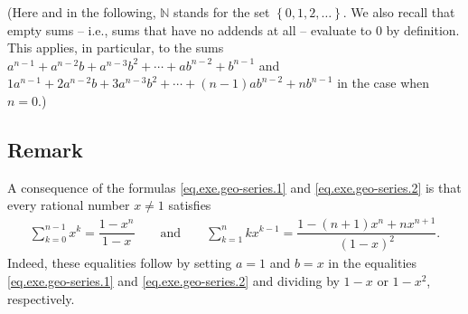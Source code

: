 \documentclass[paper=a4, fontsize=12pt]{scrartcl} %
\newcommand{\NN}{\mathbb{N}} %
\newcommand{\set}[1]{\left\{ #1 \right\}}
\newcommand{\tup}[1]{\left( #1 \right)}
\let\sumnonlimits\sum
\renewcommand{\sum}{\sumnonlimits\limits}
\theoremstyle{plainsl}
\theoremstyle{definition}
\theoremstyle{remark}
\begin{document}
(Here and in the following, $\NN$ stands for the set
$\set{0, 1, 2, \ldots}$.
We also recall that empty sums -- i.e., sums that have no
addends at all -- evaluate to $0$ by definition. This applies,
in particular, to the sums
$a^{n-1} + a^{n-2} b + a^{n-3} b^2 + \cdots + a b^{n-2} + b^{n-1}$
and
$1 a^{n-1} + 2 a^{n-2} b + 3 a^{n-3} b^2 + \cdots + \tup{n-1} a b^{n-2} + n b^{n-1}$
in the case when $n = 0$.)

\subsection{Remark}

A consequence of the formulas
\eqref{eq.exe.geo-series.1} and \eqref{eq.exe.geo-series.2}
is that every rational number $x \neq 1$ satisfies
\begin{align*}
\sum_{k=0}^{n-1} x^k = \dfrac{1 - x^n}{1 - x}
\qquad
\text{and} \qquad
\sum_{k=1}^n k x^{k-1}
= \dfrac{1 - \tup{n+1} x^n + n x^{n+1}}{\tup{1 - x}^2} .
\end{align*}
Indeed, these equalities follow by setting $a = 1$ and $b = x$
in the equalities
\eqref{eq.exe.geo-series.1} and \eqref{eq.exe.geo-series.2}
and dividing by $1-x$ or $1-x^2$, respectively.
\end{document}
